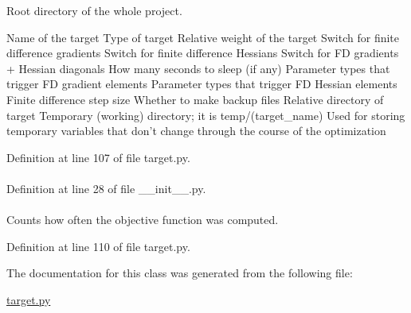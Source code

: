 \-Root directory of the whole project. 

\-Name of the target \-Type of target \-Relative weight of the target \-Switch for finite difference gradients \-Switch for finite difference \-Hessians \-Switch for \-F\-D gradients + \-Hessian diagonals \-How many seconds to sleep (if any) \-Parameter types that trigger \-F\-D gradient elements \-Parameter types that trigger \-F\-D \-Hessian elements \-Finite difference step size \-Whether to make backup files \-Relative directory of target \-Temporary (working) directory; it is temp/(target\-\_\-name) \-Used for storing temporary variables that don't change through the course of the optimization 

\-Definition at line 107 of file target.\-py.

\hypertarget{classforcebalance_1_1BaseClass_afd68efa29ccd2f320f4cf82198214aac}{
\paragraph[{verbose\-\_\-options}]{}}\label{classforcebalance_1_1BaseClass_afd68efa29ccd2f320f4cf82198214aac}


\-Definition at line 28 of file \-\_\-\-\_\-init\-\_\-\-\_\-.\-py.

\hypertarget{classforcebalance_1_1target_1_1Target_ad4cd0ab38d8fc97d3e7a6e22ce130a16}{
\paragraph[{xct}]{}}\label{classforcebalance_1_1target_1_1Target_ad4cd0ab38d8fc97d3e7a6e22ce130a16}


\-Counts how often the objective function was computed. 



\-Definition at line 110 of file target.\-py.



\-The documentation for this class was generated from the following file\-:\begin{DoxyCompactItemize}
\item 
\hyperlink{target_8py}{target.\-py}\end{DoxyCompactItemize}
